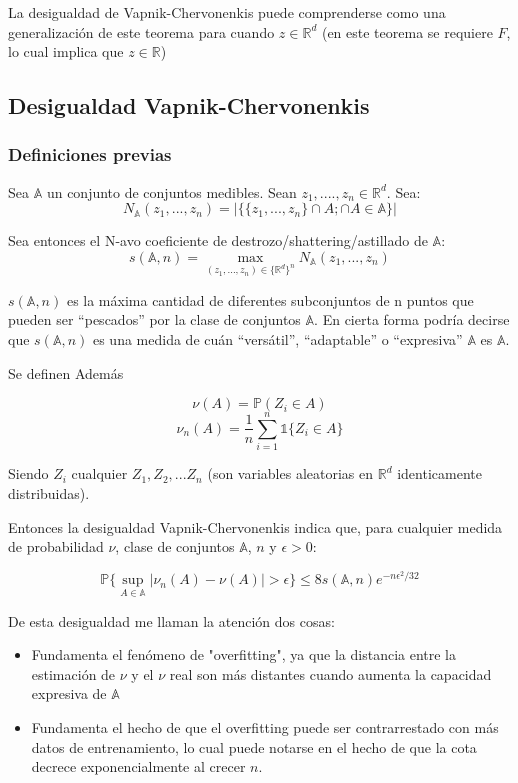 \documentclass[12pt, a4paper]{article}
\begin{document}
La desigualdad de Vapnik-Chervonenkis puede comprenderse como una generalización de este teorema para cuando $z \in \mathds{R}^d$ (en este teorema se requiere $F$, lo cual implica que $z \in \mathds{R}$)

\subsection{Desigualdad Vapnik-Chervonenkis}
\subsubsection{Definiciones previas}
Sea $\mathds{A}$ un conjunto de conjuntos medibles. Sean $z_1, ...., z_n \in \mathds{R}^d$. Sea:
$$ N_{\mathds{A}}(z_1, ..., z_n)=\bigg | \big \{ \{ z_1, ..., z_n\} \cap A; \cap A \in \mathds{A} \big \} \bigg | $$

Sea entonces el N-avo coeficiente de destrozo/shattering/astillado de $\mathds{A}$:
$$ s(\mathds{A},n) = \mathop{max}_{(z_1,...,z_n) \in \{ \mathds{R}^d \}^n} N_{\mathds{A}}(z_1, ..., z_n)$$

$ s(\mathds{A},n)$ es la máxima cantidad de diferentes subconjuntos de n puntos que pueden ser ``pescados'' por la clase de conjuntos $\mathds{A}$. En cierta forma podría decirse que $ s(\mathds{A},n)$ es una medida de cuán ``versátil'', ``adaptable'' o ``expresiva'' $\mathds{A}$ es $\mathds{A}$.

Se definen Además

$$\nu(A)=\mathds{P}(Z_i \in A)$$
$$\nu_n(A)=\frac{1}{n} \sum_{i=1}^n \mathds{1} \{ Z_i \in A \}$$

Siendo $Z_i$ cualquier $Z_1, Z_2,... Z_n$ (son variables aleatorias en $ \mathds{R}^d $ identicamente distribuidas).

Entonces la desigualdad Vapnik-Chervonenkis indica que, para cualquier medida de probabilidad $\nu$, clase de conjuntos $\mathds{A}$, $n$ y $\epsilon>0$:

$$ \mathds{P} \big \{ \mathop{sup}_{A\in \mathds{A}} | \nu_n(A) - \nu(A) | > \epsilon \big \} \leq 8 s(\mathds{A},n)e^{-n\epsilon^2 / 32} $$

De esta desigualdad me llaman la atención dos cosas:
\begin{itemize}
  \item Fundamenta el fenómeno de "overfitting", ya que la distancia entre la estimación de $\nu$ y el $\nu$ real son más distantes cuando aumenta la capacidad expresiva de $\mathds{A}$
  \item Fundamenta el hecho de que el overfitting puede ser contrarrestado con más datos de entrenamiento, lo cual puede notarse en el hecho de que la cota decrece exponencialmente al crecer $n$.
\end{itemize}
\end{document}
